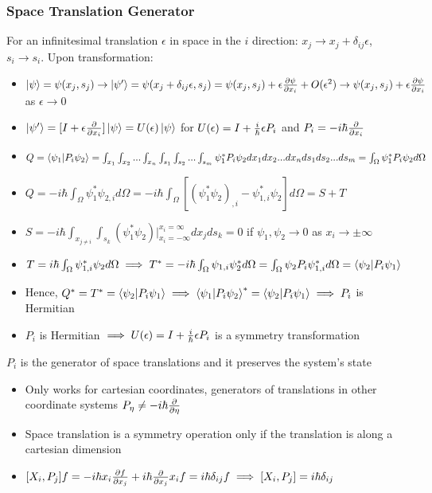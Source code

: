 \documentclass[8pt,t,mathserif,aspectratio=169]{beamer}
\begin{document}
\begin{frame}
  \frametitle{Space Translation Generator}
  \vspace{1mm}
  For an infinitesimal translation $\epsilon$ in space in the $i$ direction: $x_j \to x_j + \delta_{ij} \epsilon$, $s_i \to s_i$. Upon transformation:
  \begin{itemize}
    \item $\ket{\psi} = \psi(x_j,s_j) \to \ket{\psi'} = \psi(x_j + \delta_{ij} \epsilon,s_j) = \psi(x_j,s_j) + \epsilon {\partial \psi \over \partial x_i} + O(\epsilon^2) \to \psi(x_j,s_j) + \epsilon {\partial \psi \over \partial x_i}$ as $\epsilon \to 0$
    \item $\ket{\psi'} = [I + \epsilon {\partial \over \partial x_i}] \ket{\psi} = U(\epsilon) \ket{\psi}$ for $U(\epsilon) = I + {i \over \hbar} \epsilon P_i$ and $P_i = -i \hbar {\partial \over \partial x_i}$ 
    \item $Q = \braket{\psi_1}{P_i \psi_2} = \int_{x_1} \int_{x_2} ... \int_{x_n} \int_{s_1} \int_{s_2} ... \int_{s_m} \psi^*_1 P_i \psi_2 dx_1 dx_2 ... dx_n ds_1 ds_2 ... ds_m = \int_{\Omega} \psi^*_1 P_i \psi_2 d\Omega$
    \item $Q = -i \hbar \int_{\Omega} \psi^*_1 \psi_{2,i} d\Omega = -i \hbar \int_{\Omega} [(\psi^*_1 \psi_2)_{,i} - \psi^*_{1,i} \psi_2] d\Omega = S + T$ 
    \item $S = -i \hbar \int_{x_{j \neq i}} \int_{s_k} (\psi^*_1 \psi_2)|^{x_i = \infty}_{x_i = -\infty} dx_j ds_k = 0$ if $\psi_1,\psi_2 \to 0$ as $x_i \to \pm \infty$
    \item $T = i \hbar \int_{\Omega} \psi^*_{1,i} \psi_2 d\Omega \implies T^* = -i \hbar \int_{\Omega} \psi_{1,i} \psi^*_2 d\Omega = \int_{\Omega} \psi_2 P_i \psi^*_{1,i} d\Omega = \braket{\psi_2}{P_i \psi_1}$
    \item Hence, $Q^* = T^* = \braket{\psi_2}{P_i \psi_1} \implies \braket{\psi_1}{P_i \psi_2}^* = \braket{\psi_2}{P_i \psi_1} \implies P_i$ is Hermitian
    \item $P_i$ is Hermitian $\implies U(\epsilon) = I + {i \over \hbar} \epsilon P_i$ is a symmetry transformation
  \end{itemize}
  $P_i$ is the generator of space translations and it preserves the system's state
  \begin{itemize}
    \item Only works for cartesian coordinates, generators of translations in other coordinate systems $P_\eta \neq -i \hbar {\partial \over \partial \eta}$
    \item Space translation is a symmetry operation only if the translation is along a cartesian dimension
    \item $[X_i,P_j]f = -i \hbar x_i {\partial f \over \partial x_j} + i \hbar {\partial \over \partial x_j} x_i f = i \hbar \delta_{ij} f \implies [X_i,P_j] = i \hbar \delta_{ij}$
  \end{itemize}
\end{frame}
\end{document}
